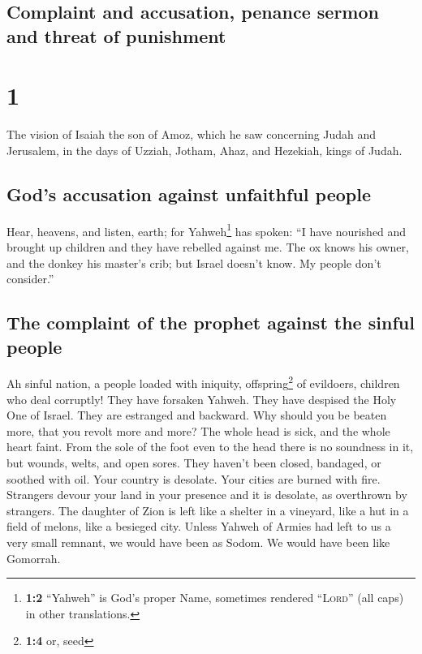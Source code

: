 \hypertarget{complaint-and-accusation-penance-sermon-and-threat-of-punishment}{%
\subsection{Complaint and accusation, penance sermon and threat of
punishment}\label{complaint-and-accusation-penance-sermon-and-threat-of-punishment}}

\hypertarget{section}{%
\section{1}\label{section}}

 The vision of Isaiah the son of Amoz, which he saw
concerning Judah and Jerusalem, in the days of Uzziah, Jotham, Ahaz, and
Hezekiah, kings of Judah.

\hypertarget{gods-accusation-against-unfaithful-people}{%
\subsection{God's accusation against unfaithful
people}\label{gods-accusation-against-unfaithful-people}}

 Hear, heavens, and listen, earth; for Yahweh\footnote{\textbf{1:2}
  ``Yahweh'' is God's proper Name, sometimes rendered ``\textsc{Lord}''
  (all caps) in other translations.} has spoken: ``I have nourished and
brought up children and they have rebelled against me. 
The ox knows his owner, and the donkey his master's crib; but Israel
doesn't know. My people don't consider.''

\hypertarget{the-complaint-of-the-prophet-against-the-sinful-people}{%
\subsection{The complaint of the prophet against the sinful
people}\label{the-complaint-of-the-prophet-against-the-sinful-people}}

 Ah sinful nation, a people loaded with iniquity,
offspring\footnote{\textbf{1:4} or, seed} of evildoers, children who
deal corruptly! They have forsaken Yahweh. They have despised the Holy
One of Israel. They are estranged and backward.  Why
should you be beaten more, that you revolt more and more? The whole head
is sick, and the whole heart faint.  From the sole of the
foot even to the head there is no soundness in it, but wounds, welts,
and open sores. They haven't been closed, bandaged, or soothed with oil.
 Your country is desolate. Your cities are burned with
fire. Strangers devour your land in your presence and it is desolate, as
overthrown by strangers.  The daughter of Zion is left
like a shelter in a vineyard, like a hut in a field of melons, like a
besieged city.  Unless Yahweh of Armies had left to us a
very small remnant, we would have been as Sodom. We would have been like
Gomorrah.

